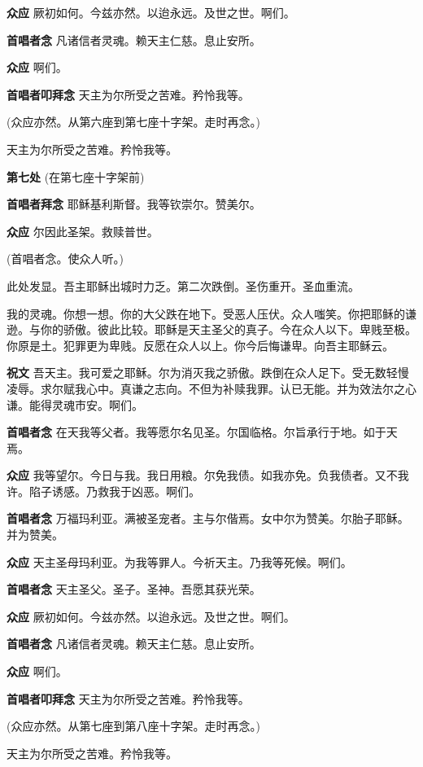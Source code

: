 \documentclass[UTF8,17pt]{ctexart}
\begin{document}
\textbf{众应} \quad 厥初如何。今兹亦然。以迨永远。及世之世。啊们。

\textbf{⾸唱者念} \quad 凡诸信者灵魂。赖天主仁慈。息⽌安所。

\textbf{众应} \quad 啊们。


\textbf{⾸唱者叩拜念} \quad 天主为尔所受之苦难。矜怜我等。

(众应亦然。从第六座到第七座⼗字架。⾛时再念。)

天主为尔所受之苦难。矜怜我等。

\textbf{第七处} (在第七座⼗字架前)

\textbf{⾸唱者拜念} \quad 耶稣基利斯督。我等钦崇尔。赞美尔。

\textbf{众应} \quad 尔因此圣架。救赎普世。

(⾸唱者念。使众⼈听。)

此处发显。吾主耶稣出城时⼒乏。第⼆次跌倒。圣伤重开。圣⾎重流。

我的灵魂。你想⼀想。你的⼤⽗跌在地下。受恶⼈压伏。众⼈嗤笑。你把耶稣的谦逊。与你的骄傲。彼此⽐较。耶稣是天主圣⽗的真⼦。今在众⼈以下。卑贱⾄极。你原是⼟。犯罪更为卑贱。反愿在众⼈以上。你今后悔谦卑。向吾主耶稣云。

\textbf{祝⽂} \quad 吾天主。我可爱之耶稣。尔为消灭我之骄傲。跌倒在众⼈⾜下。受⽆数轻慢凌辱。求尔赋我⼼中。真谦之志向。不但为补赎我罪。认已⽆能。并为效法尔之⼼谦。能得灵魂市安。啊们。

\textbf{⾸唱者念} \quad 在天我等⽗者。我等愿尔名见圣。尔国临格。尔旨承⾏于地。如于天焉。

\textbf{众应} \quad 我等望尔。今⽇与我。我⽇⽤粮。尔免我债。如我亦免。负我债者。又不我许。陷⼦诱感。乃救我于凶恶。啊们。

\textbf{⾸唱者念} \quad 万福玛利亚。满被圣宠者。主与尔偕焉。⼥中尔为赞美。尔胎⼦耶稣。并为赞美。

\textbf{众应} \quad 天主圣母玛利亚。为我等罪⼈。今祈天主。乃我等死候。啊们。

\textbf{⾸唱者念} \quad 天主圣⽗。圣⼦。圣神。吾愿其获光荣。

\textbf{众应} \quad 厥初如何。今兹亦然。以迨永远。及世之世。啊们。

\textbf{⾸唱者念} \quad 凡诸信者灵魂。赖天主仁慈。息⽌安所。

\textbf{众应} \quad 啊们。


\textbf{⾸唱者叩拜念} \quad 天主为尔所受之苦难。矜怜我等。

(众应亦然。从第七座到第八座⼗字架。⾛时再念。)

天主为尔所受之苦难。矜怜我等。
\end{document}
